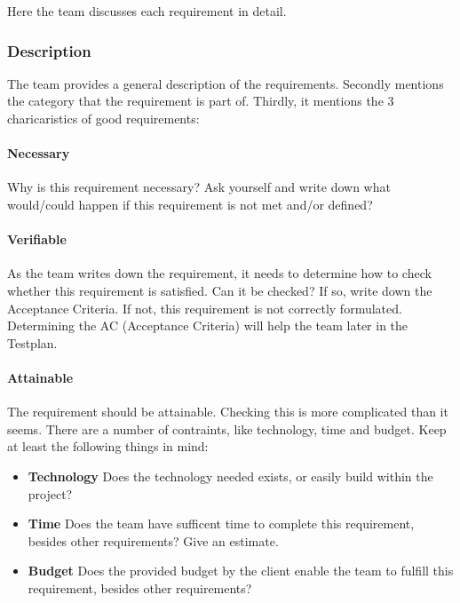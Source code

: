 \documentclass[10pt]{report}
\begin{document}
Here the team discusses each requirement in detail. 

\subsubsection{Description}

The team provides a general description of the requirements. Secondly mentions the category that the requirement is part of. Thirdly, it mentions the 3 charicaristics of good requirements:

\paragraph{Necessary}

Why is this requirement necessary? Ask yourself and write down what would/could happen if this requirement is not met and/or defined?

\paragraph{Verifiable}

As the team writes down the requirement, it needs to determine how to check whether this requirement is satisfied. Can it be checked? If so, write down the Acceptance Criteria. If not, this requirement is not correctly formulated. Determining the AC (Acceptance Criteria) will help the team later in the Testplan.

\paragraph{Attainable}

The requirement should be attainable. Checking this is more complicated than it seems. There are a number of contraints, like technology, time and budget. Keep at least the following things in mind:

\begin{itemize}
	\item \textbf{Technology} Does the technology needed exists, or easily build within the project?
	\item \textbf{Time} Does the team have sufficent time to complete this requirement, besides other requirements? Give an estimate.
	\item \textbf{Budget} Does the provided budget by the client enable the team to fulfill this requirement, besides other requirements?
\end{itemize}
\end{document}
